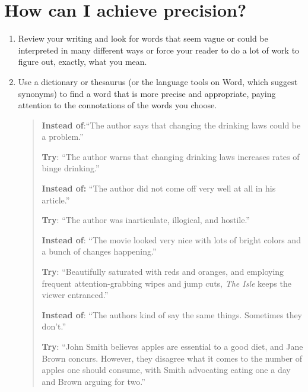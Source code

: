 \section{How can I achieve precision?}
 
 \begin{enumerate}

\item Review your writing and look for words that seem vague or could be interpreted in many different ways or force your reader to do a lot of work to figure out, exactly, what you mean.
 
\item Use a dictionary or thesaurus (or the language tools on Word, which suggest synonyms)  to find a word that is more precise and appropriate, paying attention to the connotations of the words you choose.
 
 
 \begin{quote}
\textbf{Instead of}:``The author says that changing the drinking laws could be a problem.''
 
\textbf{Try}:	``The author warns that changing drinking laws increases rates of binge drinking.''
 
\textbf{Instead of:}	``The author did not come off very well at all in his article.''
 
        	\textbf{Try}:	``The author was inarticulate, illogical, and hostile.''
 
\textbf{Instead of}:	``The movie looked very nice with lots of bright colors and a bunch of
                    	changes happening.''
 
        	\textbf{Try}:   ``Beautifully saturated with reds and oranges, and employing frequent
                    	 attention-grabbing  wipes and jump cuts, \emph{The Isle} keeps the viewer entranced.''
 
\textbf{Instead of}:   ``The authors kind of say the same things. Sometimes they don't.''
 
        	\textbf{Try}:  ``John Smith believes apples are essential to a good diet, and Jane Brown concurs.
                   	However, they disagree what it comes to the number of apples one should       
                         consume, with Smith advocating eating one a day and Brown arguing for two.''

\end{quote}
\end{enumerate}


